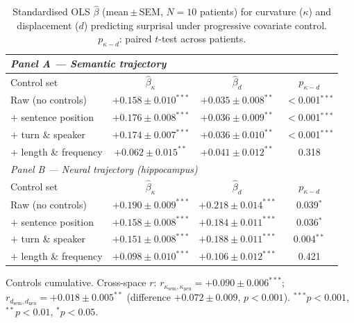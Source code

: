 \begin{table}[t]
\centering
\caption{%
  Standardised OLS $\hat\beta$ (mean\,$\pm$\,SEM, $N{=}10$ patients) for
  curvature ($\kappa$) and displacement ($d$) predicting surprisal under
  progressive covariate control. $p_{\kappa{-}d}$: paired $t$-test across patients.
}
\label{tab:curvature_ablation}
\footnotesize
\begin{tabular}{lccc}
\toprule
\multicolumn{4}{l}{\textit{Panel A — Semantic trajectory}} \\
\midrule
Control set & $\hat\beta_\kappa$ & $\hat\beta_d$ & $p_{\kappa{-}d}$ \\
\midrule
Raw (no controls)
  & $+0.158\pm0.010^{***}$ & $+0.035\pm0.008^{**}$ & $<$0.001$^{***}$ \\
$+$ sentence position
  & $+0.176\pm0.008^{***}$ & $+0.036\pm0.009^{**}$ & $<$0.001$^{***}$ \\
$+$ turn \& speaker
  & $+0.174\pm0.007^{***}$ & $+0.036\pm0.010^{**}$ & $<$0.001$^{***}$ \\
$+$ length \& frequency
  & $+0.062\pm0.015^{**}$  & $+0.041\pm0.012^{**}$ & 0.318\phantom{$^{**}$} \\
\midrule
\multicolumn{4}{l}{\textit{Panel B — Neural trajectory (hippocampus)}} \\
\midrule
Control set & $\hat\beta_\kappa$ & $\hat\beta_d$ & $p_{\kappa{-}d}$ \\
\midrule
Raw (no controls)
  & $+0.190\pm0.009^{***}$ & $+0.218\pm0.014^{***}$ & 0.039$^{*}$ \\
$+$ sentence position
  & $+0.158\pm0.008^{***}$ & $+0.184\pm0.011^{***}$ & 0.036$^{*}$ \\
$+$ turn \& speaker
  & $+0.151\pm0.008^{***}$ & $+0.188\pm0.011^{***}$ & 0.004$^{**}$ \\
$+$ length \& frequency
  & $+0.098\pm0.010^{***}$ & $+0.106\pm0.012^{***}$ & 0.421\phantom{$^{**}$} \\
\bottomrule
\end{tabular}

\vspace{4pt}
\footnotesize\raggedright
Controls cumulative. Cross-space $r$:
$r_{\kappa_\mathrm{sem},\kappa_\mathrm{neu}} = +0.090\pm0.006^{***}$;
$r_{d_\mathrm{sem},d_\mathrm{neu}} = +0.018\pm0.005^{**}$
(difference $+0.072\pm0.009$, $p{<}0.001$).
$^{***}p{<}0.001$, $^{**}p{<}0.01$, $^{*}p{<}0.05$.
\end{table}
